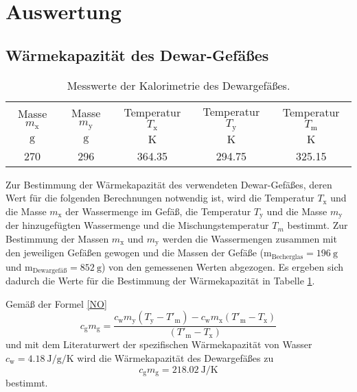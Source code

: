 \section{Auswertung}
\label{sec:Auswertung}
\subsection{Wärmekapazität des Dewar-Gefäßes}
\begin{table}[ht]
	\centering
	\begin{tabular}{ccccc}%
		\toprule
		{Masse $m_\text{x}$}& {Masse $m_\text{y}$}  &{Temperatur  $T_\text{x}$}&{Temperatur $T_\text{y}$}  &{Temperatur $T_\text{m}$}\\
		{$\si{\gram}$}& {$\si{\gram}$}  &{$\si{\kelvin}$}& {$\si{\kelvin}$}  &{$\si{\kelvin}$}\\
		\midrule
		270 & 296 & 364.35 & 294.75 & 325.15\\
		\bottomrule
	\end{tabular}
	\caption{Messwerte der Kalorimetrie des Dewargefäßes.}
	\label{tab:messung1}
\end{table}
Zur Bestimmung der Wärmekapazität des verwendeten Dewar-Gefäßes, deren Wert für die folgenden Berechnungen notwendig ist,
wird die Temperatur $T_\text{x}$ und die Masse $m_\text{x}$ der Wassermenge im Gefäß, die Temperatur $T_\text{y}$ und die Masse $m_\text{y}$ der hinzugefügten Wassermenge und die Mischungstemperatur $T_m$ bestimmt.
Zur Bestimmung der Massen $m_\text{x}$ und $m_\text{y}$ werden die Wassermengen zusammen mit den jeweiligen Gefäßen gewogen und die Massen der Gefäße 
	($\text{m}_\text{Becherglas}=\SI{196}{\gram}$ und 
	$\text{m}_\text{Dewargefäß}=\SI{852}{\gram}$)
von den gemessenen Werten abgezogen.
Es ergeben sich dadurch die Werte für die Bestimmung der Wärmekapazität in Tabelle \ref{tab:messung1}.

Gemäß der Formel \ref{NO}
\begin{equation}
	c_\mathup{g}m_\mathup{g}=\frac{c_\mathup{w}m_\mathup{y}(T_\mathup{y}-T'_\mathup{m})-c_\mathup{w}m_\mathup{x}(T'_\mathup{m}-T_\mathup{x})}{(T'_\mathup{m}-T_\mathup{x})}
\end{equation}
und mit dem Literaturwert\cite{NO} der spezifischen Wärmekapazität von Wasser \\
$c_\text{w}=\SI{4.18}{\joule\per\gram\per\kelvin}$ wird die Wärmekapazität des Dewargefäßes zu
\begin{equation}
	c_\mathup{g}m_\mathup{g}=\SI{218.02}{\joule\per\kelvin}
	\label{wert:waerme_dewar}
\end{equation}
bestimmt.

